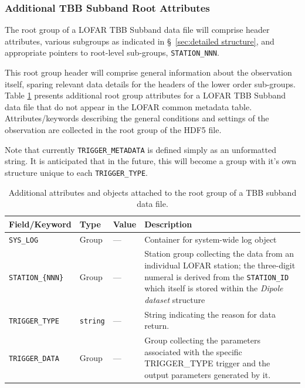 \documentclass[a4paper,10pt,bibtotoc]{scrartcl}
\begin{document}


\subsubsection{Additional TBB Subband Root Attributes}

The root group of a LOFAR TBB Subband data file will comprise
header attributes, various subgroups as indicated in \S\
\ref{sec:detailed structure}, and appropriate pointers to root-level
sub-groups, \verb|STATION_NNN|. 

This root group header will comprise general information about the
observation itself, sparing relevant data details for the headers of
the lower order sub-groups. Table \ref{tab:hdf5 root group} presents
additional root group attributes for a LOFAR TBB Subband data file
that do not appear in the LOFAR common metadata
table. Attributes/keywords describing the general conditions and
settings of the observation are collected in the root group of the HDF5 file.

Note that currently \verb|TRIGGER_METADATA| is defined simply as an unformatted string. It is
anticipated that in the future, this will become a group with it's own structure unique to
each \verb|TRIGGER_TYPE|.

\begin{table}[htb]
  \centering
  \begin{tabular}{|lllp{9cm}|}
    \hline
    \sc Field/Keyword & \sc Type & \sc Value & Description \\
    \hline \hline
    \verb|SYS_LOG|       & Group & --- & Container for system-wide log object \\
    \verb|STATION_{NNN}| & Group & --- & Station group collecting the data
    from an individual LOFAR station; the three-digit numeral is derived from
    the \verb|STATION_ID| which itself is stored within the
    \textsl{Dipole dataset} structure \\
     \verb|TRIGGER_TYPE| & \verb|string| & --- & String indicating the reason for data return.\\
    \verb|TRIGGER_DATA| & Group & --- & Group collecting the
    parameters associated with the specific TRIGGER\_TYPE trigger and the output
    parameters generated by it. \\
   \hline
  \end{tabular}
  \caption{Additional attributes and objects attached to the root
    group of a TBB subband data file.}
  \label{tab:hdf5 root group}
\end{table}
\end{document}
